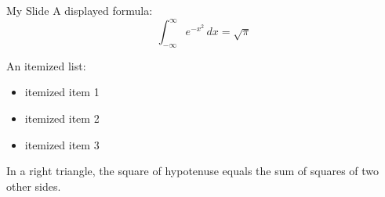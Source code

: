\documentclass{beamer}
\theoremstyle{definition}
\theoremstyle{definition}
\begin{document}
\begin{frame}{My Slide}
A displayed formula:
\[
    \int_{-\infty}^\infty e^{-x^2} \, dx = \sqrt{\pi}
\]

An itemized list:
\begin{itemize}
    \item itemized item 1
    \item itemized item 2
    \item itemized item 3
\end{itemize}

\begin{theorem}
    In a right triangle, the square of hypotenuse equals
    the sum of squares of two other sides.
\end{theorem}

\end{frame}
\end{document}
